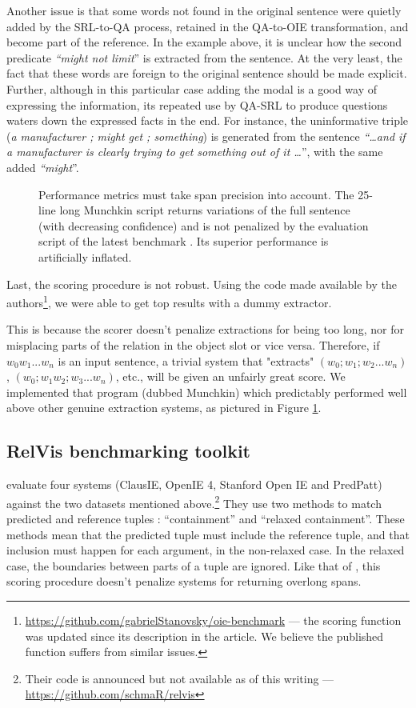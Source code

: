 \pdfoutput=1 \documentclass[11pt, a4paper]{article}
\begin{document}
Another issue is that some words not found in the original sentence were quietly added
by the SRL-to-QA process, retained in the QA-to-OIE transformation, and
become part of the reference. In the example above, it is unclear how the
second predicate \emph{``might not limit}'' is extracted from the sentence. At the very least, the fact that these words are foreign to the original sentence should be made explicit. Further,
although in this particular case adding the modal is a good way of expressing
the information, its repeated use by QA-SRL to produce questions waters down
the expressed facts in the end. For instance, the uninformative triple (\emph{a
manufacturer ; might get ; something}) is generated from the sentence \emph{``\ldots{}and
if a manufacturer is clearly trying to get something out of it \ldots{}}'', with the
same added \emph{``might}''.

\begin{figure}[ht!]
  \centering
  \caption{Performance metrics must take span precision into account. The
    25-line long Munchkin script returns variations of the full sentence (with
    decreasing confidence) and is not penalized by the evaluation script of the
    latest benchmark \cite{Stanovsky2016EMNLP}. Its superior performance is
    artificially inflated.}
  \label{fig-munchkin}
\end{figure}

Last, the scoring procedure is not robust. Using the code made available by the
authors\footnote{\url{https://github.com/gabrielStanovsky/oie-benchmark} --- the scoring
function was updated since its description in the article. We
believe the published function suffers from similar issues.}, we were
able to get top results with a dummy extractor.

This is because the scorer doesn't penalize extractions for being too long, nor for
misplacing parts of the relation in the object slot or vice versa. Therefore,
if \(w_0 w_1 ... w_n\) is an input sentence, a trivial system that "extracts"
\((w_0 ; w_1 ; w_2...w_n)\), \((w_0 ; w_1 w_2 ; w_{3}...w_n)\), etc., will be given
an unfairly great score. We implemented that program (dubbed Munchkin) which
predictably performed well above other genuine extraction systems, as pictured
in Figure \ref{fig-munchkin}.

\subsection{RelVis benchmarking toolkit}
\label{sec:org80db224}
\citet{W17-5402} evaluate four systems (ClausIE, OpenIE 4, Stanford Open IE and
PredPatt) against the two datasets mentioned above.\footnote{Their code is announced but not
available as of this writing --- \url{https://github.com/schmaR/relvis}} They
use two methods to match predicted and reference tuples : ``containment'' and
``relaxed containment''.  These methods mean that the predicted tuple must
include the reference tuple, and that inclusion must happen for each argument,
in the non-relaxed case. In the relaxed case, the boundaries between parts of a
tuple are ignored. Like that of \citet{Stanovsky2016EMNLP}, this scoring
procedure doesn't penalize systems for returning overlong spans.
\end{document}
